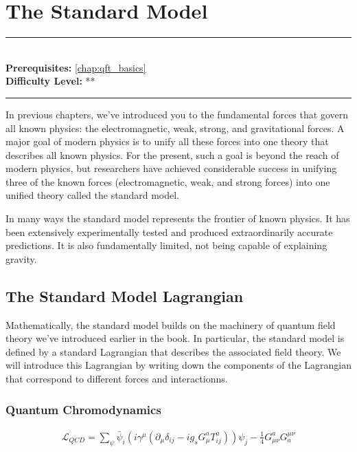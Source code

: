 \documentclass[book.tex]{subfiles}
\begin{document}
\chapter{The Standard Model}

\label{chap:standard_model}
\noindent\rule{11cm}{0.4pt} \\
\textbf{Prerequisites:} \autoref{chap:qft_basics}  \\
\textbf{Difficulty Level:} ** \\
\noindent\rule{11cm}{0.4pt}
\vspace{5mm}


In previous chapters, we've introduced you to the fundamental forces that govern all known physics: the electromagnetic, weak, strong, and gravitational forces. A major goal of modern physics is to unify all these forces into one theory that describes all known physics. For the present, such a goal is beyond the reach of modern physics, but researchers have achieved considerable success in unifying three of the known forces (electromagnetic, weak, and strong forces) into one unified theory called the standard model.

In many ways the standard model represents the frontier of known physics. It has been extensively experimentally tested and produced extraordinarily accurate predictions. It is also fundamentally limited, not being capable of explaining gravity. 

\section{The Standard Model Lagrangian}

Mathematically, the standard model builds on the machinery of quantum field theory we've introduced earlier in the book. In particular, the standard model is defined by a standard Lagrangian that describes the associated field theory. We will introduce this Lagrangian by writing down the components of the Lagrangian that correspond to different forces and interactionns.

\subsection{Quantum Chromodynamics}

\begin{align}
    \mathcal{L}_{QCD} = \sum_{\psi} \bar{\psi}_i (i\gamma^{\mu}(\partial_{\mu} \delta_{ij} - i g_s G_{\mu}^aT_{ij}^a)) \psi_j - \frac{1}{4} G_{\mu\nu}^a G^{\mu\nu}_a
\end{align}
\end{document}
